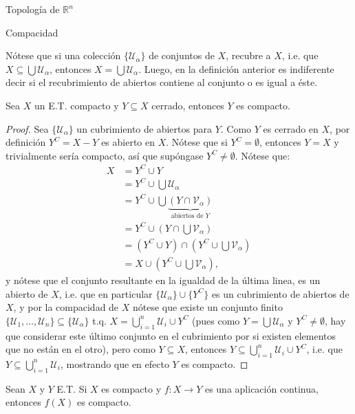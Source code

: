 \begin{chapter}{Topología de $\mathbb{R}^n$}
\begin{section}{Compacidad}
\begin{rem}
Nótese que si una colección $\{\mathcal{U}_\alpha\}$ de conjuntos de $X$, recubre a $X$, i.e. que $X\subseteq\bigcup\mathcal{U}_\alpha$, entonces $X=\bigcup\mathcal{U}_\alpha$. Luego, en la definición anterior es indiferente decir si el recubrimiento de abiertos contiene al conjunto o es igual a éste. 
\end{rem}

\begin{them}
Sea $X$ un E.T. compacto y $Y\subseteq X$ cerrado, entonces $Y$ es compacto. 
\end{them}

\begin{proof}
Sea $\{\mathcal{U}_\alpha\}$ un cubrimiento de abiertos para $Y$. Como $Y$ es cerrado en $X$, por definición $Y^C=X-Y$ es abierto en $X$. Nótese que si $Y^C=\emptyset$, entonces $Y=X$ y trivialmente sería compacto, así que supóngase $Y^C\neq\emptyset$. Nótese que:
\begin{equation*} \label{eq1}
\begin{split}
X & = Y^C\cup Y \\
 & = Y^C\cup\bigcup\mathcal{U}_\alpha \\
 & = Y^C\cup\bigcup\underbrace{(Y\cap\mathcal{V}_\alpha)}_{\text{abiertos de $Y$}} \\
 & = Y^C\cup \left(Y\cap\bigcup\mathcal{V}_\alpha\right) \\
 & = (Y^C\cup Y)\cap \left(Y^C\cup\bigcup\mathcal{V}_\alpha\right) \\
 & = X\cup\left(Y^C\cup\bigcup\mathcal{V}_\alpha\right),
\end{split}
\end{equation*}
y nótese que el conjunto resultante en la igualdad de la última linea, es un abierto de $X$, i.e. que en particular $\{\mathcal{U}_\alpha\}\cup\{Y^C\}$ es un cubrimiento de abiertos de $X$, y por la compacidad de $X$ nótese que existe un conjunto finito $\{\mathcal{U}_1,\ldots,\mathcal{U}_n\}\subseteq\{\mathcal{U}_\alpha\}$ t.q. $X=\bigcup_{i=1}^n\mathcal{U}_i\cup Y^C$ (pues como $Y=\bigcup\mathcal{U}_\alpha$ y $Y^C\neq\emptyset$, hay que considerar este último conjunto en el cubrimiento por si existen elementos que no están en el otro), pero como $Y\subseteq X$, entonces $Y\subseteq\bigcup_{i=1}^n\mathcal{U}_i\cup Y^C$, i.e. que $Y\subseteq\bigcup_{i=1}^n\mathcal{U}_i$, mostrando que en efecto $Y$ es compacto.
\end{proof}

\begin{them}
Sean $X$ y $Y$ E.T. Si $X$ es compacto y $f:X\to Y$ es una aplicación continua, entonces $f(X)$
es compacto.
\end{them}


\end{section}
\end{chapter}
